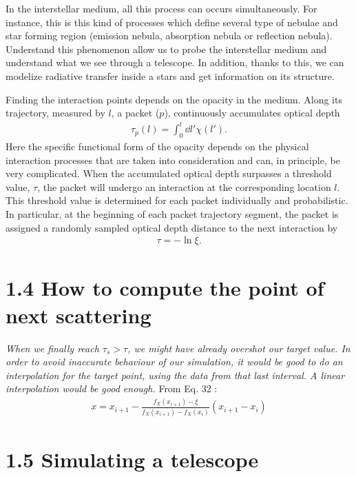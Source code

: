 \documentclass[10pt,a4paper,oneside]{article}
\begin{document}
\begin{multicols}{2}
In the interstellar medium, all this process can occurs simultaneously. For instance, this is this kind of processes which define several type of nebulae and star forming region (emission nebula, absorption nebula or reflection nebula). Understand this phenomenon allow us to  probe the interstellar medium and understand what we see through a telescope. In addition, thanks to this, we can modelize radiative transfer inside a stars and get information on its structure. 




Finding the interaction points depends on the opacity in the medium. Along its trajectory, measured by $l$, a packet ($p$), continuously accumulates optical depth
\begin{align}
    \tau_p(l)=\int_0^l \dd l' \chi(l').
\end{align}
Here the specific functional form of the opacity depends on the physical interaction processes that are taken into consideration and can, in principle, be very complicated. When the accumulated optical depth surpasses a threshold value, $\tau$, the packet will undergo an interaction at the corresponding location $l$. This threshold value is determined for each packet individually and probabilistic. In particular, at the beginning of each packet trajectory segment, the packet is assigned a randomly sampled optical depth distance to the next interaction by
\begin{align}
    \tau = -\ln \xi.
\end{align}


\section*{1.4 How to compute the point of next scattering}

\textit{\quad When we finally reach $\tau_s >\tau$, we might have already overshot our target value. In order to avoid inaccurate behaviour of our simulation, it would be good to do an interpolation for the target point, using the data from that last interval. A linear interpolation would be good enough.} From \cite{Noebauer_2019} Eq. 32 :
\begin{align*}
    x=x_{i+1}-\frac{f_X(x_{i+1} )-\xi }{f_X(x_{i+1} )-f_X(x_i)}(x_{i+1}-x_i)
\end{align*}

\section*{1.5 Simulating a telescope}


\end{multicols}
\end{document}

